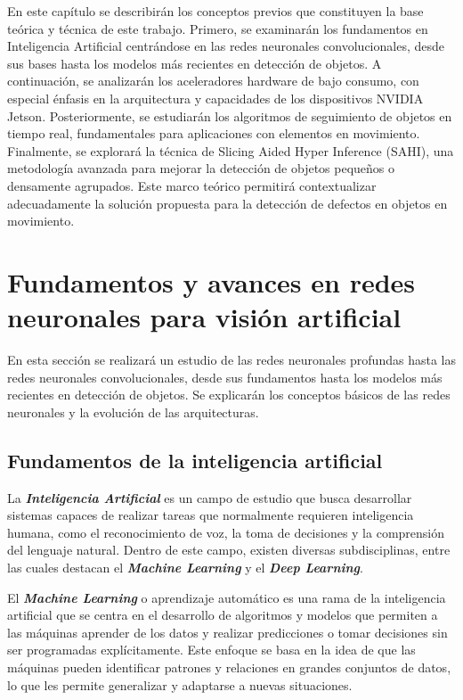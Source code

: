 \documentclass[11pt,spanish,listoffigures,listoftables]{tfgetsinf}
\begin{document}
En este capítulo se describirán los conceptos previos que constituyen la base teórica y técnica de este trabajo. Primero, se examinarán los fundamentos en Inteligencia Artificial centrándose en las redes neuronales convolucionales, desde sus bases hasta los modelos más recientes en detección de objetos. A continuación, se analizarán los aceleradores hardware de bajo consumo, con especial énfasis en la arquitectura y capacidades de los dispositivos NVIDIA Jetson. Posteriormente, se estudiarán los algoritmos de seguimiento de objetos en tiempo real, fundamentales para aplicaciones con elementos en movimiento. Finalmente, se explorará la técnica de Slicing Aided Hyper Inference (SAHI), una metodología avanzada para mejorar la detección de objetos pequeños o densamente agrupados. Este marco teórico permitirá contextualizar adecuadamente la solución propuesta para la detección de defectos en objetos en movimiento.

\section{Fundamentos y avances en redes neuronales para visión artificial} \label{sec:fundamentos_avances}
En esta sección se realizará un estudio de las redes neuronales profundas hasta las redes neuronales convolucionales, desde sus fundamentos hasta los modelos más recientes en detección de objetos. Se explicarán los conceptos básicos de las redes neuronales y la evolución de las arquitecturas.

\subsection{Fundamentos de la inteligencia artificial} \label{sec:fundamentos_inteligencia_artificial}
La \textit{\textbf{Inteligencia Artificial}} es un campo de estudio que busca desarrollar sistemas capaces de realizar tareas que normalmente requieren inteligencia humana, como el reconocimiento de voz, la toma de decisiones y la comprensión del lenguaje natural. Dentro de este campo, existen diversas subdisciplinas, entre las cuales destacan el \textit{\textbf{Machine Learning}} y el \textit{\textbf{Deep Learning}}.

El \textit{\textbf{Machine Learning}} o aprendizaje automático es una rama de la inteligencia artificial que se centra en el desarrollo de algoritmos y modelos que permiten a las máquinas aprender de los datos y realizar predicciones o tomar decisiones sin ser programadas explícitamente. Este enfoque se basa en la idea de que las máquinas pueden identificar patrones y relaciones en grandes conjuntos de datos, lo que les permite generalizar y adaptarse a nuevas situaciones.
\end{document}
